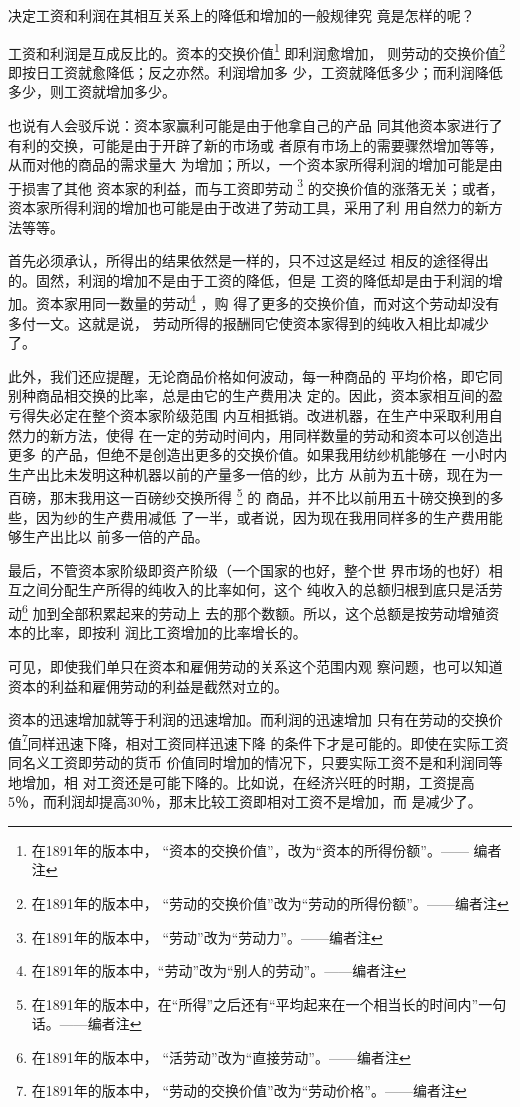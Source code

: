 \documentclass[a4paper,twoside,12pt,AutoFakeBold]{ctexart}
\begin{document}
决定工资和利润在其相互关系上的降低和增加的一般规律究
竟是怎样的呢？

工资和利润是互成反比的。资本的交换价值\footnote{在1891年的版本中， “资本的交换价值”，改为“资本的所得份额”。—— 编者
注} 即利润愈增加，
则劳动的交换价值\footnote{在1891年的版本中， “劳动的交换价值”改为“劳动的所得份额”。——编者注} 即按日工资就愈降低；反之亦然。利润增加多
少，工资就降低多少；而利润降低多少，则工资就增加多少。

也说有人会驳斥说：资本家赢利可能是由于他拿自己的产品
同其他资本家进行了有利的交换，可能是由于开辟了新的市场或
者原有市场上的需要骤然增加等等，从而对他的商品的需求量大
为增加；所以，一个资本家所得利润的增加可能是由于损害了其他
资本家的利益，而与工资即劳动 \footnote{在1891年的版本中， “劳动”改为“劳动力”。——编者注} 的交换价值的涨落无关；或者，
资本家所得利润的增加也可能是由于改进了劳动工具，采用了利
用自然力的新方法等等。

首先必须承认，所得出的结果依然是一样的，只不过这是经过
相反的途径得出的。固然，利润的增加不是由于工资的降低，但是
工资的降低却是由于利润的增加。资本家用同一数量的劳动\footnote{在1891年的版本中，“劳动”改为“别人的劳动”。——编者注} ，购
得了更多的交换价值，而对这个劳动却没有多付一文。这就是说，
劳动所得的报酬同它使资本家得到的纯收入相比却减少了。

此外，我们还应提醒，无论商品价格如何波动，每一种商品的
平均价格，即它同别种商品相交换的比率，总是由它的生产费用决
定的。因此，资本家相互间的盈亏得失必定在整个资本家阶级范围
内互相抵销。改进机器，在生产中采取利用自然力的新方法，使得
在一定的劳动时间内，用同样数量的劳动和资本可以创造出更多
的产品，但绝不是创造出更多的交换价值。如果我用纺纱机能够在
一小时内生产出比未发明这种机器以前的产量多一倍的纱，比方
从前为五十磅，现在为一百磅，那末我用这一百磅纱交换所得 \footnote{在1891年的版本中，在“所得”之后还有“平均起来在一个相当长的时间内”一句话。——编者注} 的
商品，并不比以前用五十磅交换到的多些，因为纱的生产费用减低
了一半，或者说，因为现在我用同样多的生产费用能够生产出比以
前多一倍的产品。

最后，不管资本家阶级即资产阶级（一个国家的也好，整个世
界市场的也好）相互之间分配生产所得的纯收入的比率如何，这个
纯收入的总额归根到底只是活劳动\footnote{在1891年的版本中， “活劳动”改为“直接劳动”。——编者注} 加到全部积累起来的劳动上
去的那个数额。所以，这个总额是按劳动增殖资本的比率，即按利
润比工资增加的比率增长的。

可见，即使我们单只在资本和雇佣劳动的关系这个范围内观
察问题，也可以知道资本的利益和雇佣劳动的利益是截然对立的。

资本的迅速增加就等于利润的迅速增加。而利润的迅速增加
只有在劳动的交换价值\footnote{在1891年的版本中， “劳动的交换价值”改为“劳动价格”。——编者注}同样迅速下降，相对工资同样迅速下降
的条件下才是可能的。即使在实际工资同名义工资即劳动的货币
价值同时增加的情况下，只要实际工资不是和利润同等地增加，相
对工资还是可能下降的。比如说，在经济兴旺的时期，工资提高
5％，而利润却提高30％，那末比较工资即相对工资不是增加，而
是减少了。
\end{document}
